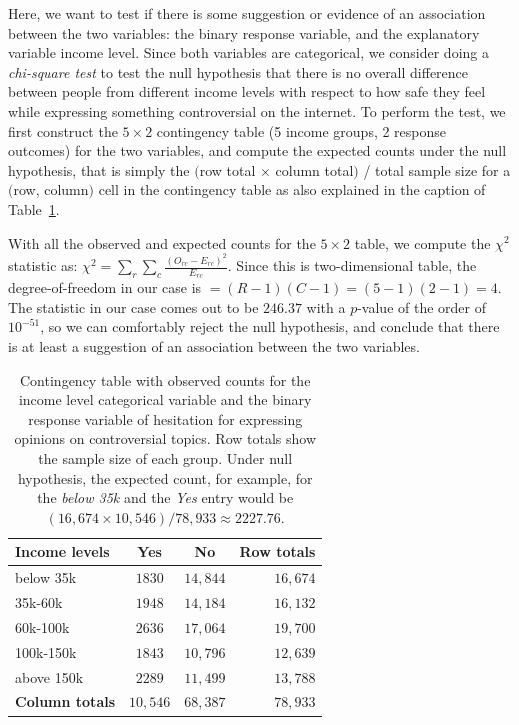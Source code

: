 \documentclass{article}
\theoremstyle{plain}
\theoremstyle{definition}
\theoremstyle{remark}
\begin{document}
Here, we want to test if there is some suggestion or evidence of an association between the two variables: the binary response variable, and the explanatory variable income level.
Since both variables are categorical, we consider doing a \emph{chi-square test} to test the null hypothesis that there is no overall difference between people from different income levels with respect to how safe they feel while expressing something controversial on the internet. To perform the test, we first construct the $5\times2$ contingency table (5 income groups, 2 response outcomes) for the two variables, and compute the expected counts under the null hypothesis, that is simply the $($row total $\times$ column total$)$ / total sample size for a $($row, column$)$ cell in the contingency table as also explained in the caption of Table~\ref{tab:contingency_income_response}.

With all the observed and expected counts for the $5\times2$ table, we compute the $\chi^2$ statistic as: $\chi^2 = \sum_{r} \sum_{c} \frac{(O_{rc} - E_{rc})^2}{E_{rc}}$. Since this is two-dimensional table, the degree-of-freedom in our case is $=(R-1)(C-1)=(5-1)(2-1)=4$. The statistic in our case comes out to be $246.37$ with a $p$-value of the order of $10^{-51}$, so we can comfortably reject the null hypothesis, and conclude that there is at least a suggestion of an association between the two variables.




\begin{table}[h]
    \centering
    \begin{tabular}{lcc|r}
\toprule
\textbf{Income levels} & \textbf{Yes} & \textbf{No} & \textbf{Row totals} \\
\midrule
below 35k & $1830$ & $14,844$ & $16,674$ \\
35k-60k & $1948$ & $14,184$ & $16,132$ \\
60k-100k & $2636$ & $17,064$ & $19,700$ \\
100k-150k & $1843$ & $10,796$ & $12,639$ \\
above 150k & $2289$ & $11,499$ & $13,788$ \\
\midrule
\textbf{Column totals} & $10,546$ & $68,387$ & $78,933$ \\
\bottomrule
\end{tabular}
    \caption{Contingency table with observed counts for the income level categorical variable and the binary response variable of hesitation for expressing opinions on controversial topics. Row totals show the sample size of each group. Under null hypothesis, the expected count, for example, for the \emph{below 35k} and the \emph{Yes} entry would be $(16, 674 \times 10,546) / 78,933 \approx 2227.76$.}
    \label{tab:contingency_income_response}
\end{table}
\end{document}
